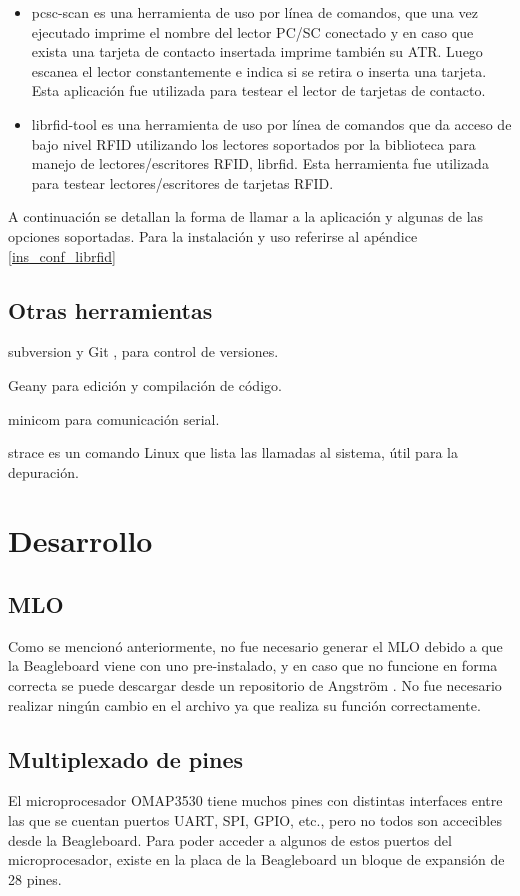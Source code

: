 \begin{itemize}
\item pcsc-scan es una herramienta de uso por línea de comandos, que una vez ejecutado imprime el nombre del lector PC/SC conectado y en caso que exista una tarjeta de contacto insertada imprime también su ATR. Luego  escanea el lector constantemente e indica si se retira o inserta una tarjeta. Esta aplicación fue utilizada para testear el lector de tarjetas de contacto.
\item  librfid-tool es una herramienta de uso por línea de comandos que da acceso de bajo nivel RFID utilizando los lectores soportados por la biblioteca para manejo de lectores/escritores RFID, librfid. Esta herramienta fue utilizada para testear lectores/escritores de tarjetas RFID.
\end{itemize}

A continuación se detallan la forma de llamar a la aplicación y algunas de las opciones soportadas. Para la instalación y uso referirse al apéndice \ref{ins_conf_librfid}

\subsection{Otras herramientas}
subversion \cite{subversion} y Git \cite{git}, para control de versiones. 

Geany \cite{geany} para edición y compilación de código.

minicom \cite{minicom} para comunicación serial.

strace es un comando Linux que lista las llamadas al sistema, útil para la depuración.

\section{Desarrollo}

\subsection{MLO}
Como se mencionó anteriormente, no fue necesario generar el MLO debido a que la Beagleboard viene con uno pre-instalado, y en caso que no funcione en forma correcta se puede descargar desde un repositorio de Angström \cite{Angs_MLO}. No fue necesario realizar ningún cambio en el archivo ya que realiza su función correctamente.

\subsection{Multiplexado de pines}
El microprocesador OMAP3530 tiene muchos pines con distintas interfaces entre las
que se cuentan puertos UART, SPI, GPIO, etc., pero no todos son accecibles desde la Beagleboard. 
Para poder acceder a algunos de estos puertos del microprocesador, existe en la placa de la
Beagleboard un bloque de expansión de 28 pines.

